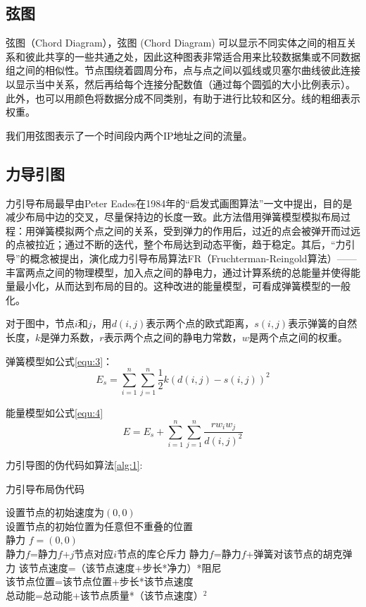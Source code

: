 \documentclass[journal]{vgtc}                %
\begin{document}
\subsection{弦图}
弦图（Chord Diagram），弦图 (Chord Diagram) 可以显示不同实体之间的相互关系和彼此共享的一些共通之处，因此这种图表非常适合用来比较数据集或不同数据组之间的相似性。节点围绕着圆周分布，点与点之间以弧线或贝塞尔曲线彼此连接以显示当中关系，然后再给每个连接分配数值（通过每个圆弧的大小比例表示）。此外，也可以用颜色将数据分成不同类别，有助于进行比较和区分。线的粗细表示权重。

我们用弦图表示了一个时间段内两个IP地址之间的流量。

\subsection{力导引图}
力引导布局最早由Peter Eades在1984年的“启发式画图算法”一文中提出，目的是减少布局中边的交叉，尽量保持边的长度一致。此方法借用弹簧模型模拟布局过程：用弹簧模拟两个点之间的关系，受到弹力的作用后，过近的点会被弹开而过远的点被拉近；通过不断的迭代，整个布局达到动态平衡，趋于稳定。其后，“力引导”的概念被提出，演化成力引导布局算法FR（Fruchterman-Reingold算法）——丰富两点之间的物理模型，加入点之间的静电力，通过计算系统的总能量并使得能量最小化，从而达到布局的目的。这种改进的能量模型，可看成弹簧模型的一般化。

对于图中，节点$i$和$j$，用$d(i,j)$表示两个点的欧式距离，$s(i,j)$表示弹簧的自然长度，$k$是弹力系数，$r$表示两个点之间的静电力常数，$w$是两个点之间的权重。

弹簧模型如公式\ref{equ:3}：
\begin{equation}
\label{equ:3}
E_s = \sum_{i=1}^{n}\sum_{j=1}^{n}\frac{1}{2}k(d(i,j)-s(i,j))^2
\end{equation}

能量模型如公式\ref{equ:4}
\begin{equation}
\label{equ:4}
E=E_s+\sum_{i=1}^{n}\sum_{j=1}^{n}\frac{rw_iw_j}{d(i,j)^2}
\end{equation}

力引导图的伪代码如算法\ref{alg:1}:

\begin{algorithm}
	\BlankLine
	\caption{力引导布局伪代码}\label{alg:1}
	\BlankLine
	设置节点的初始速度为$(0,0)$\\
	设置节点的初始位置为任意但不重叠的位置\\
	
	{
		静力 $f=(0,0)$\\
		{
			静力$f$=静力$f$+$j$节点对应$i$节点的库仑斥力
		}
		{
			静力$f$=静力$f$+弹簧对该节点的胡克弹力
		}
		该节点速度=（该节点速度+步长*净力）*阻尼\\
		该节点位置=该节点位置+步长*该节点速度\\
		总动能=总动能+该节点质量*（该节点速度）$^2$
	}

	
\end{algorithm}
\end{document}
